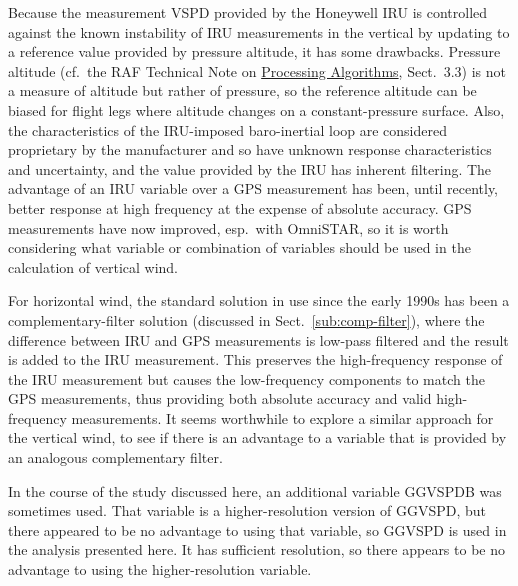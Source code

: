 \documentclass[12pt,twoside,english]{article}\usepackage[]{graphicx}\usepackage[]{color}
\let\OrgIndex\index
\renewcommand*{\index}[1]{\OrgIndex{#1}}
\begin{document}
Because the measurement VSPD provided by the Honeywell IRU is controlled against the known instability of IRU measurements in the vertical by updating to a reference value provided by pressure altitude, it has some drawbacks. Pressure altitude (cf.~the RAF Technical Note on \href{https://drive.google.com/open?id=0B1kIUH45ca5Ab2Z6cld1M1cydjA&authuser=0}{Processing Algorithms}, Sect.~3.3) is not a measure of altitude but rather of pressure, so the reference altitude can be biased for flight legs where altitude changes on a constant-pressure surface. Also, the characteristics of the IRU-imposed baro-inertial loop are considered proprietary by the manufacturer and so have unknown response characteristics and uncertainty, and the value provided by the IRU has inherent filtering. The advantage of an IRU variable over a GPS measurement has been, until recently, better response at high frequency at the expense of absolute accuracy. GPS measurements have now improved, esp.~with OmniSTAR, so it is worth considering what variable or combination of variables should be used in the calculation of vertical wind. 

For horizontal wind, the standard solution in use since the early 1990s has been a complementary-filter solution (discussed in Sect.~\ref{sub:comp-filter}), where the difference between IRU and GPS measurements is low-pass filtered and the result is added to the IRU measurement. This preserves the high-frequency response of the IRU measurement but causes the low-frequency components to match the GPS measurements, thus providing both absolute accuracy and valid high-frequency measurements. It seems worthwhile to explore a similar approach for the vertical wind, to see if there is an advantage to a variable that is provided by an analogous complementary filter. 

In the course of the study discussed here, an additional variable
GGVSPDB was
sometimes used. That variable is a higher-resolution version of GGVSPD,
but there appeared to be no advantage to using that variable, so GGVSPD
is used in the analysis presented here. It has sufficient resolution,
so there appears to be no advantage to using the higher-resolution
variable.
\end{document}
